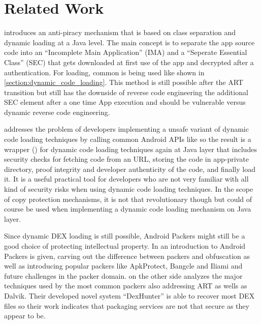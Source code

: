 \chapter{Related Work}\label{chapter:related_workd}
\parencite{anti_piracy} introduces an anti-piracy mechanism that is based on class
separation and dynamic loading at a Java level. The main concept is to separate the app source code into an ``Incomplete Main Application'' (IMA) and a ``Seperate Essential Class'' (SEC) that gets downloaded at first use of the app and decrypted after a authentication. For loading, common  is being used like shown in
\autoref{section:dynamic_code_loading}. This method is still possible after the ART transition but still has the downside of reverse code engineering the additional SEC 
element after a one time App execution and should be vulnerable versus dynamic reverse code engineering.

\parencite{grab_n_run} addresses the problem of developers implementing a unsafe variant of dynamic code loading techniques by calling common Android APIs like  so the result is a wrapper () for dynamic code loading techniques again at Java layer that includes security checks for fetching code from an URL, storing the code in app-private directory, proof integrity and developer authenticity of the code, and finally load it. It is a useful practical tool for developers who are not very familiar with all kind of security risks when using dynamic code loading techniques. In the scope of copy protection mechanisms, it is not that revolutionary though but could of course be used when implementing a dynamic code loading mechanism on Java layer.

Since dynamic DEX loading is still possible, Android Packers might still be a 
good choice of protecting intellectual property. In \parencite{android_packer}
an introduction to Android Packers is given, carving out the difference between
packers and obfuscation as well as introducing popular packers like ApkProtect,
Bangcle and Iliami and future challenges in the packer domain.
\parencite{dexhunter} on the other side analyzes the major techniques 
used by the most common packers also addressing ART as wells as Dalvik.
Their developed novel system ``DexHunter'' is able to recover most DEX files so
their work indicates that packaging services are not that secure as they appear to be.

